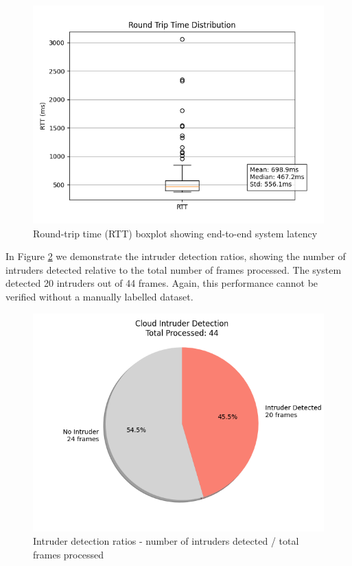 \documentclass[conference]{IEEEtran}
\begin{document}
\begin{figure}[h!]
    \centering
    \includegraphics[width=1\linewidth]{./res/evaluation_with_latencies/rtt_distribution.png}
    \caption{Round-trip time (RTT) boxplot showing end-to-end system latency}
    \label{fig:rtt_distribution}
\end{figure}

In Figure \ref{fig:intruder_ratios} we demonstrate the intruder detection ratios, showing the number of intruders detected relative to the total number of frames processed. The system detected 20 intruders out of 44 frames. Again, this performance cannot be verified without a manually labelled dataset. 


\begin{figure}[!h]
    \centering
    \includegraphics[width=1\linewidth]{./res/evaluation_with_latencies/intruder_ratios.png}
    \caption{Intruder detection ratios - number of intruders detected / total frames processed}
    
    \label{fig:intruder_ratios}
\end{figure}
\end{document}
